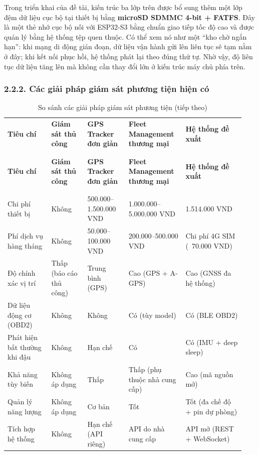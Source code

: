 \documentclass[a4paper]{extarticle}
\newcommand{\thesissettableid}[2]{%
  \renewcommand{\thetable}{#1}%
  \renewcommand{\theHtable}{#2}%
}
\begin{document}
Trong triển khai của đề tài, kiến trúc ba lớp trên được bổ sung thêm một
lớp đệm dữ liệu cục bộ tại thiết bị bằng \textbf{microSD SDMMC 4-bit +
FATFS}. Đây là một thẻ nhớ cục bộ nối với ESP32-S3 bằng chuẩn giao tiếp
tốc độ cao và được quản lý bằng hệ thống tệp quen thuộc. Có thể xem nó
như một ``kho chờ ngắn hạn'': khi mạng di động gián đoạn, dữ liệu vận
hành gửi lên liên tục sẽ tạm nằm ở đây; khi kết nối phục hồi, hệ thống
phát lại theo đúng thứ tự. Nhờ vậy, độ liên tục dữ liệu tăng lên mà
không cần thay đổi lớn ở kiến trúc máy chủ phía trên.

\subsubsection{2.2.2. Các giải pháp giám sát phương tiện hiện
có}\label{222-cuxe1c-giux1ea3i-phuxe1p-giuxe1m-suxe1t-phux1b0ux1a1ng-tiux1ec7n-hiux1ec7n-cuxf3}

{\thesissettableid{2.1}{tab-ch2-vehicle-monitoring-solutions-comparison}
\def\LTcaptype{table}
\begin{longtable}{|L{0.179\linewidth}|L{0.141\linewidth}|L{0.167\linewidth}|L{0.227\linewidth}|L{0.231\linewidth}|}
\caption{So sánh các giải pháp giám sát phương tiện}\label{tab:ch2-vehicle-monitoring-solutions-comparison}\\
\hline \textbf{Tiêu chí} & \textbf{Giám sát thủ công} & \textbf{GPS Tracker đơn giản} & \textbf{Fleet Management
thương mại} & \textbf{Hệ thống đề xuất} \\
\\\hline
\endfirsthead
\caption[]{So sánh các giải pháp giám sát phương tiện (tiếp theo)}\\
\hline \textbf{Tiêu chí} & \textbf{Giám sát thủ công} & \textbf{GPS Tracker đơn giản} & \textbf{Fleet Management
thương mại} & \textbf{Hệ thống đề xuất} \\
\\\hline
\endhead
\\\hline
\endfoot
\endlastfoot
Chi phí thiết bị & Không & 500.000--1.500.000 VND & 1.000.000--5.000.000
VND & 1.514.000 VND \\\hline
Phí dịch vụ hàng tháng & Không & 50.000--100.000 VND & 200.000--500.000
VND & Chi phí 4G SIM (~70.000 VND) \\\hline
Độ chính xác vị trí & Thấp (báo cáo thủ công) & Trung bình (GPS) & Cao
(GPS + A-GPS) & Cao (GNSS đa hệ thống) \\\hline
Dữ liệu động cơ (OBD2) & Không & Không & Có (tùy model) & Có (BLE
OBD2) \\\hline
Phát hiện bất thường khi đậu & Không & Hạn chế & Có & Có (IMU + deep
sleep) \\\hline
Khả năng tùy biến & Không áp dụng & Thấp & Thấp (phụ thuộc nhà cung cấp) & Cao
(mã nguồn mở) \\\hline
Quản lý năng lượng & Không áp dụng & Cơ bản & Tốt & Tốt (đa chế độ + pin
dự phòng) \\\hline
Tích hợp hệ thống & Không & Hạn chế (API riêng) & API do nhà cung cấp & API mở
(REST + WebSocket) \\\hline
\end{longtable}
}
\end{document}
